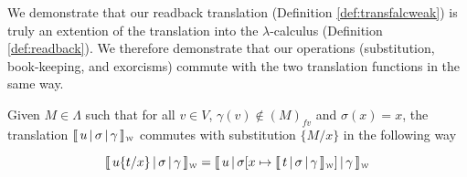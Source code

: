 \documentclass[a4paper,UKenglish,cleveref, autoref]{lipics-v2019}
\newcommand{\fv}[1]{(#1)_{fv}}
\newcommand{\sub}[3]{#1 \{ #2 / #3 \}}
\newcommand{\weaksymbol}{\mbox{\tiny $\mathcal{W}$}}
\newcommand{\readweakwmap}[3]{\llbracket \, #1 \, \vert \, #2 \, \vert \, #3  \, \rrbracket_{\weaksymbol} }
\begin{document}
\noindent We demonstrate that our readback translation (Definition \ref{def:transfalcweak}) is truly an extention of the translation into the $\lambda$-calculus (Definition \ref{def:readback}). We therefore demonstrate that our operations (substitution, book-keeping, and exorcisms) commute with the two translation functions in the same way.

\begin{proposition}
\label{prop:suboutcomm}
Given $M \in \Lambda$ such that for all $v \in V$, $\gamma(v) \not\in \fv{M}$  and $\sigma(x) = x$, the translation $\readweakwmap{u}{\sigma}{\gamma}$ commutes with substitution $\sub{}{M}{x}$ in the following way 

$$\readweakwmap{u \sub{}{t}{x}}{\sigma}{\gamma} = \readweakwmap{u}{\sigma[x \mapsto \readweakwmap{t}{\sigma}{\gamma}]}{\gamma}$$
\end{proposition}
\end{document}
